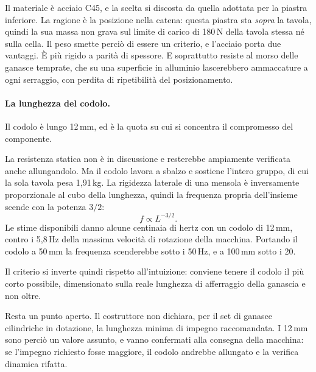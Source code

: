 Il materiale è acciaio C45, e la scelta si discosta da quella adottata per la
piastra inferiore. La ragione è la posizione nella catena: questa piastra sta
\emph{sopra} la tavola, quindi la sua massa non grava sul limite di carico di
180\,N della tavola stessa né sulla cella. Il peso smette perciò di essere un
criterio, e l'acciaio porta due vantaggi. È più rigido a parità di spessore. E
soprattutto resiste al morso delle ganasce temprate, che su una superficie in
alluminio lascerebbero ammaccature a ogni serraggio, con perdita di ripetibilità
del posizionamento.

\paragraph{La lunghezza del codolo.}
Il codolo è lungo 12\,mm, ed è la quota su cui si concentra il compromesso del
componente.

La resistenza statica non è in discussione e resterebbe ampiamente verificata
anche allungandolo. Ma il codolo lavora a sbalzo e sostiene l'intero gruppo, di
cui la sola tavola pesa 1,91\,kg. La rigidezza laterale di una mensola è
inversamente proporzionale al cubo della lunghezza, quindi la frequenza propria
dell'insieme scende con la potenza $3/2$:
\begin{equation}
    f \propto L^{-3/2} .
\end{equation}
Le stime disponibili danno alcune centinaia di hertz con un codolo di
12\,mm, contro i 5,8\,Hz della massima velocità di rotazione della macchina.
Portando il codolo a 50\,mm la frequenza scenderebbe sotto i 50\,Hz, e a
100\,mm sotto i 20.

Il criterio si inverte quindi rispetto all'intuizione: conviene tenere il codolo
il più corto possibile, dimensionato sulla reale lunghezza di afferraggio della
ganascia e non oltre.

Resta un punto aperto. Il costruttore non dichiara, per il set di ganasce
cilindriche in dotazione, la lunghezza minima di impegno raccomandata. I 12\,mm
sono perciò un valore assunto, e vanno confermati alla consegna della macchina:
se l'impegno richiesto fosse maggiore, il codolo andrebbe allungato e la
verifica dinamica rifatta.

